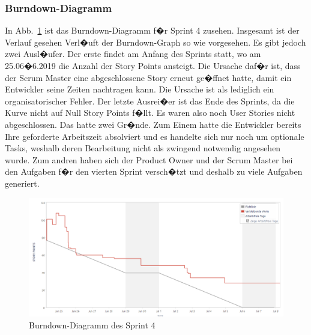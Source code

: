 \documentclass[12pt, titlepage]{scrartcl}
\newcommand{\Abb}[1]{%
	Abb.\ \ref{#1}%
}
\begin{document}
			\subsubsection{Burndown-Diagramm}
			In \Abb{BurndownSprint4} ist das Burndown-Diagramm f�r Sprint 4 zusehen. Insgesamt ist der Verlauf gesehen Verl�uft der Burndown-Graph so wie vorgesehen. Es gibt jedoch zwei Ausl�ufer. Der erste findet am Anfang des Sprints statt, wo am 25.06�6.2019 die Anzahl der Story Points ansteigt. Die Ursache daf�r ist, dass der Scrum Master eine abgeschlossene Story erneut ge�ffnet hatte, damit ein Entwickler seine Zeiten nachtragen kann. Die Ursache ist als lediglich ein organisatorischer Fehler. Der letzte Ausrei�er ist das Ende des Sprints, da die Kurve nicht auf Null Story Points f�llt. Es waren also noch User Stories nicht abgeschlossen. Das hatte zwei Gr�nde. Zum Einem hatte die Entwickler bereits Ihre geforderte Arbeitszeit absolviert und es handelte sich nur noch um optionale Tasks, weshalb deren Bearbeitung nicht als zwingend notwendig angesehen wurde. Zum andren haben sich der Product Owner und der Scrum Master bei den Aufgaben f�r den vierten Sprint versch�tzt und deshalb zu viele Aufgaben generiert.
			\begin{figure}[H] 
				\centering
				\includegraphics[width=1\textwidth]{BurndownChart_Sprint4.PNG}
				\caption{Burndown-Diagramm des Sprint 4}
				\label{BurndownSprint4}
			\end{figure}
\end{document}
